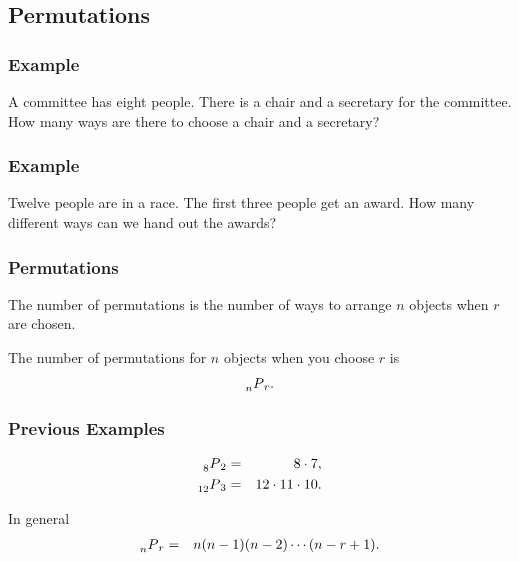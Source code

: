\subsection{Permutations}

\begin{frame}
  \frametitle{Example}
  A committee has eight people. There is a chair and a secretary for
  the committee. How many ways are there to choose a chair and a
  secretary?

  \vfill

  \textit{{\color{red}{order matters!}}}

\end{frame}

\begin{frame}
  \frametitle{Example}
  Twelve people are in a race. The first three people get an
  award. How many different ways can we hand out the awards?

  \vfill

  \textit{{\color{red}{order matters!}}}
\end{frame}


\begin{frame}
  \frametitle{Permutations}
  \begin{definition}[Permutations]
    The number of permutations is the number of ways to arrange $n$
    objects when $r$ are chosen. \textit{{\color{red}{(The order matters.)}}}
  \end{definition}

  {
    \begin{definition}[Notation]
      The number of permutations for $n$ objects when you choose $r$
      is 
      \begin{eqnarray*}
        \prescript{~}{n}{P}_r.
      \end{eqnarray*}
    \end{definition}
  }

\end{frame}

\begin{frame}
  \frametitle{Previous Examples}

  \begin{eqnarray*}
    \prescript{~}{8}{P}_2 & = & 8\cdot 7, \\
    \prescript{~}{12}{P}_3 & = & 12\cdot 11 \cdot 10. \\
  \end{eqnarray*}


  {

    \begin{definition}

      In general
      \begin{eqnarray*}
        \prescript{~}{n}{P}_r & = & n(n-1)(n-2)\cdots(n-r+1).
      \end{eqnarray*}

      
    \end{definition}

  }
  
\end{frame}


